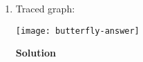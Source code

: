 \documentclass[11pt]{article}
\newenvironment{Parts}{\begin{enumerate}[label=(\alph*)]}{\end{enumerate}}
\newcommand*{\Part}{\item}
\newenvironment{Answer}{\vspace{10pt}\begin{mdframed}\textbf{Solution}\\}{\end{mdframed}\vfill\pagebreak[3]}
\newenvironment{Answer}{\vspace{10pt}}{\vfill\pagebreak[3]}
\begin{document}
\begin{Parts}
\pagebreak  

 \Part Traced graph:

 \begin{center}
    \texttt{[image: butterfly-answer]}
 \end{center}

 \begin{Answer}
 
 \end{Answer}

\end{Parts}

\end{document}
